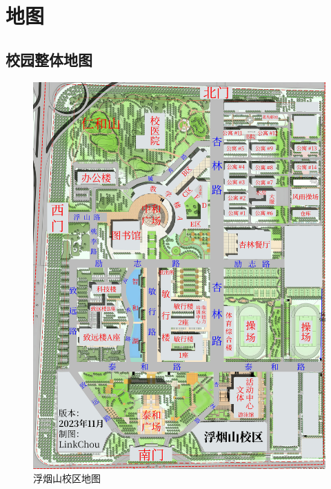 \chapter[地图]{地图\vspace{-2em}}
\section[校园整体地图]{校园整体地图}
\vspace{-1em}
\begin{figure}[ht]
    \centering
    \includegraphics*[height=0.77\textheight]{地图_updated.jpg}
    \vspace{-1em}
    \caption[map_all]{浮烟山校区地图}
    \vspace{-1em}
    \label{map_a}
\end{figure}

